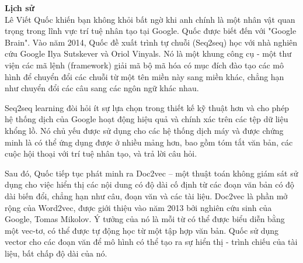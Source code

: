 \large\textbf{Lịch sử} \\[0.2em]
Lê Viết Quốc khiến bạn không khỏi bất ngờ khi anh chính là một nhân vật quan trọng trong lĩnh vực trí tuệ nhân tạo
tại Google. Quốc được biết đến với "Google Brain".  Vào năm 2014, Quốc đề xuất trình tự chuỗi (Seq2seq) học với nhà
nghiên cứu Google Ilya Sutskever và Oriol Vinyals. Nó là một khung công cụ - một thư viện các mã lệnh (framework)
giải mã bộ mã hóa có mục đích đào tạo các mô hình để chuyển đổi các chuỗi từ một tên miền này sang miền khác, chẳng
hạn như chuyển đổi các câu sang các ngôn ngữ khác nhau.

Seq2seq learning đòi hỏi ít sự lựa chọn trong thiết kế kỹ thuật hơn và cho phép hệ thống dịch của Google hoạt động
hiệu quả và chính xác trên các tệp dữ liệu khổng lồ. Nó chủ yếu được sử dụng cho các hệ thống dịch máy và được chứng
minh là có thể ứng dụng được ở nhiều mảng hơn, bao gồm tóm tắt văn bản, các cuộc hội thoại với trí tuệ nhân tạo, và
trả lời câu hỏi.

Sau đó, Quốc tiếp tục phát minh ra Doc2vec – một thuật toán không giám sát sử dụng cho việc hiển thị các nội dung có
độ dài cố định từ các đoạn văn bản có độ dài biến đổi, chẳng hạn như câu, đoạn văn và các tài liệu.
Doc2vec là phần mở rộng của Word2vec, được giới thiệu vào năm 2013 bởi nghiên cứu sinh của Google, Tomas Mikolov. Ý
tưởng của nó là mỗi từ có thể được biểu diễn bằng một vec-tơ, có thể được tự động học từ một tập hợp văn bản. Quốc sử
dụng vector cho các đoạn văn để mô hình có thể tạo ra sự hiển thị - trình chiếu của tài liệu, bất chấp độ dài của nó.